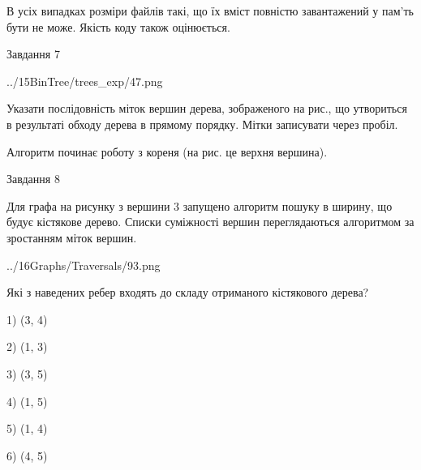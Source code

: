 \documentclass[12pt, ukrainian]{article}
\begin{document}
{В усіх випадках розміри файлів такі, що їх вміст повністю завантажений у пам'ть бути не може. Якість коду також оцінюється.



\vspace{10mm}\par

\newpage
\begin{minipage}[t]{9.7cm}
               
{\begin{center}Завдання {7}\end{center}}
\vspace{-4mm}

\begin{center}
	{../15BinTree/trees_exp/47.png}
\end{center}
Указати послідовність міток вершин дерева, зображеного на рис., що утвориться в результаті обходу дерева в прямому порядку. Мітки записувати через пробіл.\par Алгоритм починає роботу з кореня (на рис. це верхня вершина).\par

\end{minipage}
\vline \hspace{8mm}
\begin{minipage}[t]{8.0cm}
               
{\begin{center}Завдання {8}\end{center}}
\vspace{-4mm}
Для графа на рисунку з вершини 3 запущено алгоритм пошуку в ширину, що будує кістякове дерево. Списки суміжності вершин переглядаються алгоритмом за зростанням міток вершин.\par
\begin{center}
	{../16Graphs/Traversals/93.png}
\end{center}
\par Які з наведених ребер входять до складу отриманого кістякового дерева?\par
1) (3, 4)\par
2) (1, 3)\par
3) (3, 5)\par
4) (1, 5)\par
5) (1, 4)\par
6) (4, 5)\par
{\vskip 15pt} \par


\end{minipage}}
\end{document}

